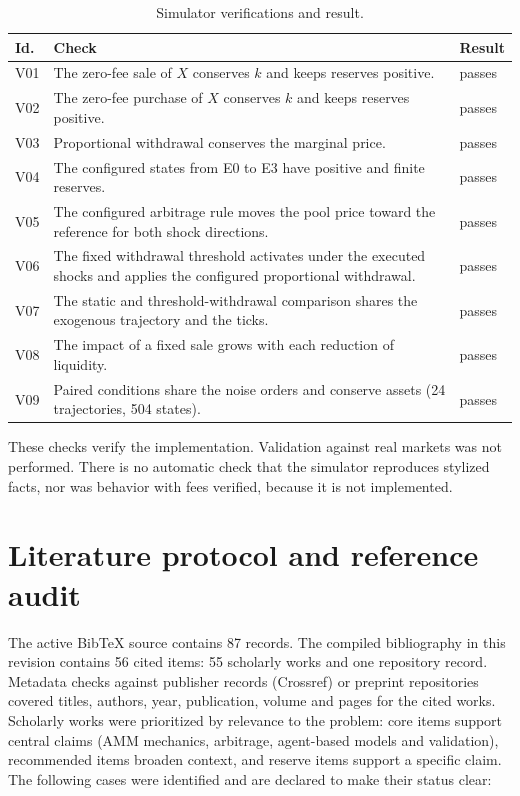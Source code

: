 \begin{table}[htbp]
\centering
\caption{Simulator verifications and result.}
\label{tab:verificacion}
\small
\begin{tabularx}{\textwidth}{@{}l X l@{}}
\toprule
Id. & Check & Result \\
\midrule
V01 & The zero-fee sale of $X$ conserves $k$ and keeps reserves positive. & passes \\
V02 & The zero-fee purchase of $X$ conserves $k$ and keeps reserves positive. & passes \\
V03 & Proportional withdrawal conserves the marginal price. & passes \\
V04 & The configured states from E0 to E3 have positive and finite reserves. & passes \\
V05 & The configured arbitrage rule moves the pool price toward the reference for both shock directions. & passes \\
V06 & The fixed withdrawal threshold activates under the executed shocks and applies the configured proportional withdrawal. & passes \\
V07 & The static and threshold-withdrawal comparison shares the exogenous trajectory and the ticks. & passes \\
V08 & The impact of a fixed sale grows with each reduction of liquidity. & passes \\
V09 & Paired conditions share the noise orders and conserve assets (24 trajectories, 504 states). & passes \\
\bottomrule
\end{tabularx}
\end{table}

These checks verify the implementation. Validation against real markets was not performed. There is no automatic check that the simulator reproduces stylized facts, nor was behavior with fees verified, because it is not implemented.

\section{Literature protocol and reference audit}
\label{sec:protocolo-literatura}

The active BibTeX source contains 87 records. The compiled bibliography in this revision contains 56 cited items: 55 scholarly works and one repository record. Metadata checks against publisher records (Crossref) or preprint repositories covered titles, authors, year, publication, volume and pages for the cited works. Scholarly works were prioritized by relevance to the problem: core items support central claims (AMM mechanics, arbitrage, agent-based models and validation), recommended items broaden context, and reserve items support a specific claim. The following cases were identified and are declared to make their status clear:

